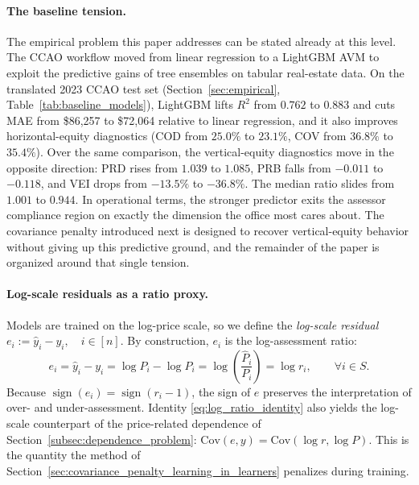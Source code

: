 \documentclass{article}
\theoremstyle{plain}
\theoremstyle{definition}
\newcommand{\1}{\mathbf{1}}
\newcommand{\Cov}{\text{Cov}}
\begin{document}
\paragraph{The baseline tension.}
The empirical problem this paper addresses can be stated already at this level. The CCAO workflow moved from linear regression to a LightGBM AVM to exploit the predictive gains of tree ensembles on tabular real-estate data. On the translated 2023 CCAO test set (Section~\ref{sec:empirical}, Table~\ref{tab:baseline_models}), LightGBM lifts $R^2$ from $0.762$ to $0.883$ and cuts MAE from \$86{,}257 to \$72{,}064 relative to linear regression, and it also improves horizontal-equity diagnostics (COD from $25.0\%$ to $23.1\%$, COV from $36.8\%$ to $35.4\%$). Over the same comparison, the vertical-equity diagnostics move in the opposite direction: PRD rises from $1.039$ to $1.085$, PRB falls from $-0.011$ to $-0.118$, and VEI drops from $-13.5\%$ to $-36.8\%$. The median ratio slides from $1.001$ to $0.944$. In operational terms, the stronger predictor exits the assessor compliance region on exactly the dimension the office most cares about. The covariance penalty introduced next is designed to recover vertical-equity behavior without giving up this predictive ground, and the remainder of the paper is organized around that single tension.

\paragraph{Log-scale residuals as a ratio proxy.} Models are trained on the log-price scale, so we define the \emph{log-scale residual}
$
e_i := \hat y_i - y_i, \quad i\in[n].
$
By construction, $e_i$ is the log-assessment ratio:
\begin{equation}
\label{eq:log_ratio_identity}
e_i
=
\hat y_i-y_i
=
\log \widehat P_i-\log P_i
=
\log\!\left(\frac{\widehat P_i}{P_i}\right)
=
\log r_i,
\qquad \forall i\in S.
\end{equation}
Because $\operatorname{sign}(e_i)=\operatorname{sign}(r_i-1)$, the sign of $e$ preserves the interpretation of over- and under-assessment. Identity \eqref{eq:log_ratio_identity} also yields the log-scale counterpart of the price-related dependence of Section~\ref{subsec:dependence_problem}: $\Cov(e,y)=\Cov(\log r,\log P)$. This is the quantity the method of Section~\ref{sec:covariance_penalty_learning_in_learners} penalizes during training.


\end{document}
